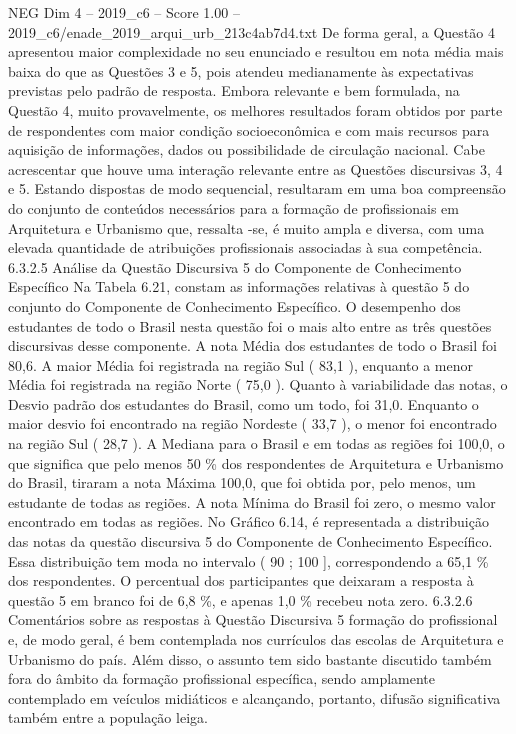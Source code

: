 \begin{textsample}{NEG Dim 4 – 2019\_c6 – Score 1.00 – 2019\_c6/enade\_2019\_arqui\_urb\_213c4ab7d4.txt}
De forma geral, a Questão 4 apresentou maior complexidade no seu enunciado e resultou em nota média mais baixa do que as Questões 3 e 5, pois atendeu medianamente às expectativas previstas pelo padrão de resposta.
Embora relevante e bem formulada, na Questão 4, muito provavelmente, os melhores resultados foram obtidos por parte de respondentes com maior condição socioeconômica e com mais recursos para aquisição de informações, dados ou possibilidade de circulação nacional.
Cabe acrescentar que houve uma interação relevante entre as Questões discursivas 3, 4 e 5.
Estando dispostas de modo sequencial, resultaram em uma boa compreensão do conjunto de conteúdos necessários para a formação de profissionais em Arquitetura e Urbanismo que, ressalta -se, é muito ampla e diversa, com uma elevada quantidade de atribuições profissionais associadas à sua competência. 6.3.2.5 Análise da Questão Discursiva 5 do Componente de Conhecimento Específico Na Tabela 6.21, constam as informações relativas à questão 5 do conjunto do Componente de Conhecimento Específico.
O desempenho dos estudantes de todo o Brasil nesta questão foi o mais alto entre as três questões discursivas desse componente.
A nota Média dos estudantes de todo o Brasil foi 80,6.
A maior Média foi registrada na região Sul ( 83,1 ), enquanto a menor Média foi registrada na região Norte ( 75,0 ).
Quanto à variabilidade das notas, o Desvio padrão dos estudantes do Brasil, como um todo, foi 31,0.
Enquanto o maior desvio foi encontrado na região Nordeste ( 33,7 ), o menor foi encontrado na região Sul ( 28,7 ).
A Mediana para o Brasil e em todas as regiões foi 100,0, o que significa que pelo menos 50 \% dos respondentes de Arquitetura e Urbanismo do Brasil, tiraram a nota Máxima 100,0, que foi obtida por, pelo menos, um estudante de todas as regiões.
A nota Mínima do Brasil foi zero, o mesmo valor encontrado em todas as regiões.
No Gráfico 6.14, é representada a distribuição das notas da questão discursiva 5 do Componente de Conhecimento Específico.
Essa distribuição tem moda no intervalo ( 90 ; 100 ], correspondendo a 65,1 \% dos respondentes.
O percentual dos participantes que deixaram a resposta à questão 5 em branco foi de 6,8 \%, e apenas 1,0 \% recebeu nota zero. 6.3.2.6 Comentários sobre as respostas à Questão Discursiva 5 formação do profissional e, de modo geral, é bem contemplada nos currículos das escolas de Arquitetura e Urbanismo do país.
Além disso, o assunto tem sido bastante discutido também fora do âmbito da formação profissional específica, sendo amplamente contemplado em veículos midiáticos e alcançando, portanto, difusão significativa também entre a população leiga.

\end{textsample}

